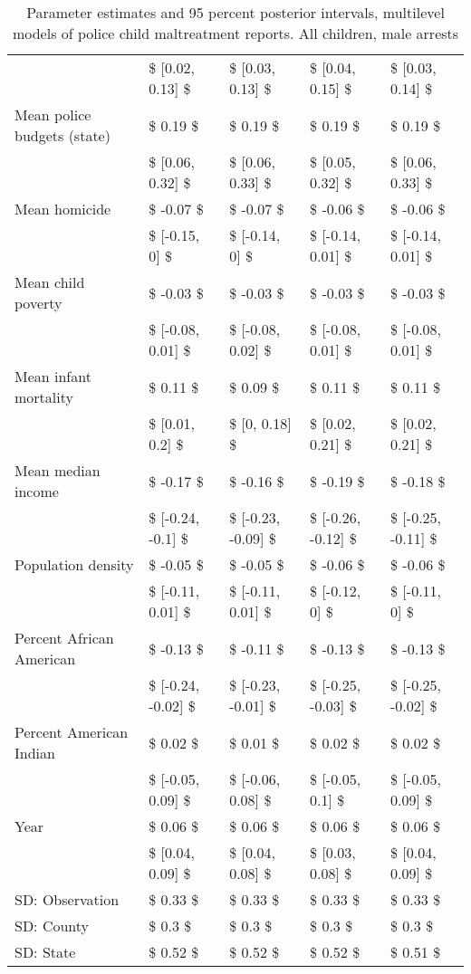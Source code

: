 \begin{table}[ht]
\begin{tabular}{lllll}
   & \$ [0.02, 0.13] \$ & \$ [0.03, 0.13] \$ & \$ [0.04, 0.15] \$ & \$ [0.03, 0.14] \$ \\ 
  Mean police budgets (state) & \$ 0.19 \$ & \$ 0.19 \$ & \$ 0.19 \$ & \$ 0.19 \$ \\ 
   & \$ [0.06, 0.32] \$ & \$ [0.06, 0.33] \$ & \$ [0.05, 0.32] \$ & \$ [0.06, 0.33] \$ \\ 
  Mean homicide & \$ -0.07 \$ & \$ -0.07 \$ & \$ -0.06 \$ & \$ -0.06 \$ \\ 
   & \$ [-0.15, 0] \$ & \$ [-0.14, 0] \$ & \$ [-0.14, 0.01] \$ & \$ [-0.14, 0.01] \$ \\ 
  Mean child poverty & \$ -0.03 \$ & \$ -0.03 \$ & \$ -0.03 \$ & \$ -0.03 \$ \\ 
   & \$ [-0.08, 0.01] \$ & \$ [-0.08, 0.02] \$ & \$ [-0.08, 0.01] \$ & \$ [-0.08, 0.01] \$ \\ 
  Mean infant mortality & \$ 0.11 \$ & \$ 0.09 \$ & \$ 0.11 \$ & \$ 0.11 \$ \\ 
   & \$ [0.01, 0.2] \$ & \$ [0, 0.18] \$ & \$ [0.02, 0.21] \$ & \$ [0.02, 0.21] \$ \\ 
  Mean median income & \$ -0.17 \$ & \$ -0.16 \$ & \$ -0.19 \$ & \$ -0.18 \$ \\ 
   & \$ [-0.24, -0.1] \$ & \$ [-0.23, -0.09] \$ & \$ [-0.26, -0.12] \$ & \$ [-0.25, -0.11] \$ \\ 
  Population density & \$ -0.05 \$ & \$ -0.05 \$ & \$ -0.06 \$ & \$ -0.06 \$ \\ 
   & \$ [-0.11, 0.01] \$ & \$ [-0.11, 0.01] \$ & \$ [-0.12, 0] \$ & \$ [-0.11, 0] \$ \\ 
  Percent African American & \$ -0.13 \$ & \$ -0.11 \$ & \$ -0.13 \$ & \$ -0.13 \$ \\ 
   & \$ [-0.24, -0.02] \$ & \$ [-0.23, -0.01] \$ & \$ [-0.25, -0.03] \$ & \$ [-0.25, -0.02] \$ \\ 
  Percent American Indian & \$ 0.02 \$ & \$ 0.01 \$ & \$ 0.02 \$ & \$ 0.02 \$ \\ 
   & \$ [-0.05, 0.09] \$ & \$ [-0.06, 0.08] \$ & \$ [-0.05, 0.1] \$ & \$ [-0.05, 0.09] \$ \\ 
  Year & \$ 0.06 \$ & \$ 0.06 \$ & \$ 0.06 \$ & \$ 0.06 \$ \\ 
   & \$ [0.04, 0.09] \$ & \$ [0.04, 0.08] \$ & \$ [0.03, 0.08] \$ & \$ [0.04, 0.09] \$ \\ 
  SD: Observation & \$ 0.33 \$ & \$ 0.33 \$ & \$ 0.33 \$ & \$ 0.33 \$ \\ 
  SD: County & \$ 0.3 \$ & \$ 0.3 \$ & \$ 0.3 \$ & \$ 0.3 \$ \\ 
  SD: State & \$ 0.52 \$ & \$ 0.52 \$ & \$ 0.52 \$ & \$ 0.51 \$ \\ 
   \hline
\end{tabular}
\caption{Parameter estimates and 95 percent posterior intervals, multilevel models of 
             police child maltreatment reports. All children, male arrests} 
\end{table}
